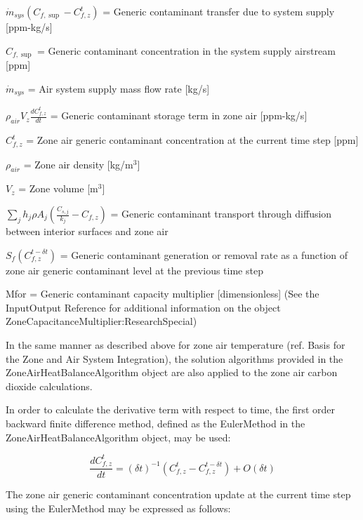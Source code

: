 \({\dot m_{sys}}\left( {{C_{f,\sup }} - C_{f,z}^t} \right)\) = Generic contaminant transfer due to system supply {[}ppm-kg/s{]}

\({C_{f,\sup }}\) = Generic contaminant concentration in the system supply airstream {[}ppm{]}

\({\dot m_{sys}}\) = Air system supply mass flow rate {[}kg/s{]}

\({\rho_{air}}{V_z}\frac{{dC_{f,z}^t}}{{dt}}\) = Generic contaminant storage term in zone air {[}ppm-kg/s{]}

\(C_{f,z}^t\) = Zone air generic contaminant concentration at the current time step {[}ppm{]}

\({\rho_{air}}\) = Zone air density {[}kg/m\(^{3}\){]}

\({V_z}\) = Zone volume {[}m\(^{3}\){]}

\(\sum\limits_j {{h_j}\rho {A_j}(\frac{{{C_{s,j}}}}{{{k_j}}} - {C_{f,z}})}\) = Generic contaminant transport through diffusion between interior surfaces and zone air

\({S_f}(C_{f,z}^{t - \delta t})\) = Generic contaminant generation or removal rate as a function of zone air generic contaminant level at the previous time step

Mfor = Generic contaminant capacity multiplier {[}dimensionless{]} (See the InputOutput Reference for additional information on the object ZoneCapacitanceMultiplier:ResearchSpecial)

In the same manner as described above for zone air temperature (ref. Basis for the Zone and Air System Integration), the solution algorithms provided in the ZoneAirHeatBalanceAlgorithm object are also applied to the zone air carbon dioxide calculations.

In order to calculate the derivative term with respect to time, the first order backward finite difference method, defined as the EulerMethod in the ZoneAirHeatBalanceAlgorithm object, may be used:

\begin{equation}
\frac{{dC_{f,z}^t}}{{dt}} = {\left( {\delta t} \right)^{ - 1}}(C_{f,z}^t - C_{f,z}^{t - \delta t}) + O(\delta t)
\end{equation}

The zone air generic contaminant concentration update at the current time step using the EulerMethod may be expressed as follows:

